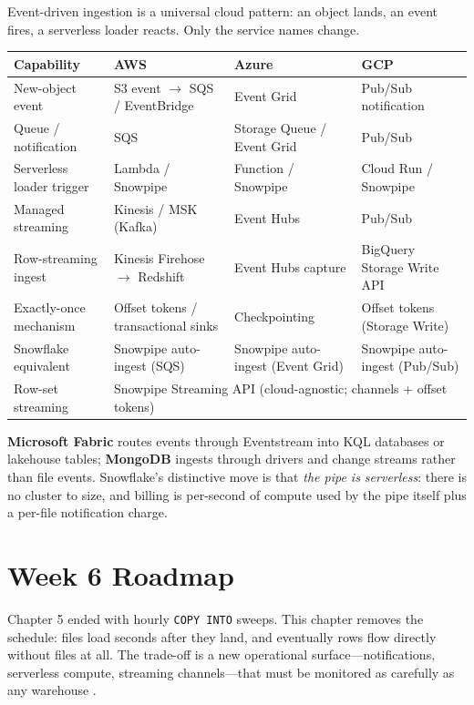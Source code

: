 \begin{crosscloud}
Event-driven ingestion is a universal cloud pattern: an object lands, an event fires, a serverless loader reacts. Only the service names change.

\vspace{2mm}
{\footnotesize
\begin{tabular}{@{}p{2.8cm}p{3.0cm}p{3.0cm}p{3.0cm}@{}}
\toprule
\textbf{Capability} & \textbf{AWS} & \textbf{Azure} & \textbf{GCP} \\
\midrule
New-object event & S3 event $\rightarrow$ SQS / EventBridge & Event Grid & Pub/Sub notification \\
Queue / notification & SQS & Storage Queue / Event Grid & Pub/Sub \\
Serverless loader trigger & Lambda / Snowpipe & Function / Snowpipe & Cloud Run / Snowpipe \\
Managed streaming & Kinesis / MSK (Kafka) & Event Hubs & Pub/Sub \\
Row-streaming ingest & Kinesis Firehose $\rightarrow$ Redshift & Event Hubs capture & BigQuery Storage Write API \\
Exactly-once mechanism & Offset tokens / transactional sinks & Checkpointing & Offset tokens (Storage Write) \\
\addlinespace
Snowflake equivalent & Snowpipe auto-ingest (SQS) & Snowpipe auto-ingest (Event Grid) & Snowpipe auto-ingest (Pub/Sub) \\
Row-set streaming & \multicolumn{3}{l}{Snowpipe Streaming API (cloud-agnostic; channels + offset tokens)} \\
\bottomrule
\end{tabular}}

\vspace{1mm}
\textbf{Microsoft Fabric} routes events through Eventstream into KQL databases or lakehouse tables; \textbf{MongoDB} ingests through drivers and change streams rather than file events. Snowflake's distinctive move is that \emph{the pipe is serverless}: there is no cluster to size, and billing is per-second of compute used by the pipe itself plus a per-file notification charge.
\end{crosscloud}

\section{Week 6 Roadmap}
Chapter 5 ended with hourly \texttt{COPY INTO} sweeps. This chapter removes the schedule: files load seconds after they land, and eventually rows flow directly without files at all. The trade-off is a new operational surface---notifications, serverless compute, streaming channels---that must be monitored as carefully as any warehouse \cite{snowflakeSnowpipeDocs}.

